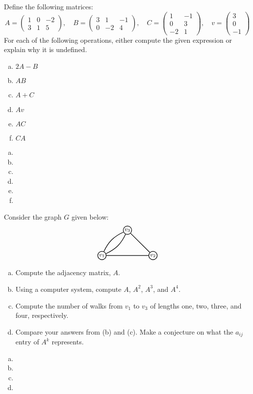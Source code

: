 \documentclass[11pt,letterpaper]{article}
\begin{document}
\newpage





 Define the following matrices:
	\[
	A= 
	\begin{pmatrix}
	1 & 0 & -2 \\
	3 & 1 & 5 
	\end{pmatrix}, \quad
	B= 
	\begin{pmatrix}
	3 & 1 & -1 \\
	0 & -2 & 4
	\end{pmatrix}, \quad
	C=
	\begin{pmatrix}
	1 & -1 \\
	0 & 3 \\
	-2 & 1
	\end{pmatrix}, \quad
	v= 
	\begin{pmatrix}
	3 \\
	0 \\
	-1
	\end{pmatrix}
	\]
For each of the following operations, either compute the given expression or explain why it is undefined. 

\begin{enumerate}[(a)]
\item $2A - B$
\item $AB$
\item $A + C$
\item $Av$
\item $AC$
\item $CA$
\end{enumerate} \pspace

\sol
\begin{enumerate}[(a)]
\item 
\item 
\item 
\item 
\item 
\item  
\end{enumerate}





\newpage





 Consider the graph $G$ given below: 
	\[
	\graphSeven
	\] 

\begin{enumerate}[(a)]
\item Compute the adjacency matrix, $A$.
\item Using a computer system, compute $A$, $A^2$, $A^3$, and $A^4$. 
\item Compute the number of walks from $v_1$ to $v_3$ of lengths one, two, three, and four, respectively. 
\item Compare your answers from (b) and (c). Make a conjecture on what the $a_{ij}$ entry of $A^k$ represents. 
\end{enumerate} \pspace

\sol
\begin{enumerate}[(a)]
\item 
\item 
\item 
\item 
\end{enumerate}
\end{document}
